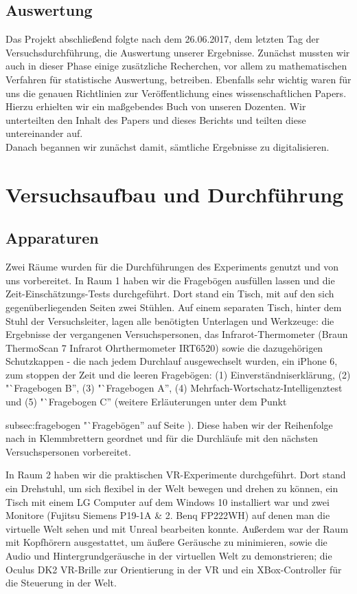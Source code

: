 \documentclass{Bericht}
\begin{document}
	\subsection{Auswertung} %
		Das Projekt abschließend folgte nach dem 26.06.2017, dem letzten Tag der Versuchsdurchführung, die Auswertung unserer Ergebnisse.
		Zunächst mussten wir auch in dieser Phase einige zusätzliche Recherchen, vor allem zu mathematischen Verfahren für statistische Auswertung, betreiben. Ebenfalls sehr wichtig waren für uns die genauen Richtlinien zur Veröffentlichung eines wissenschaftlichen Papers. Hierzu erhielten wir ein maßgebendes Buch von unseren Dozenten. Wir unterteilten den Inhalt des Papers und dieses Berichts und teilten diese untereinander auf.\\
		Danach begannen wir zunächst damit, sämtliche Ergebnisse zu digitalisieren.

\clearpage
	\section{Versuchsaufbau und Durchführung} %


\subsection {Apparaturen}
Zwei Räume wurden für die Durchführungen des Experiments genutzt und von uns vorbereitet. In Raum 1 haben wir die Fragebögen ausfüllen lassen und die Zeit-Einschätzungs-Tests durchgeführt. Dort stand ein Tisch, mit auf den sich gegenüberliegenden Seiten zwei Stühlen. Auf einem separaten Tisch, hinter dem Stuhl der Versuchsleiter, lagen alle benötigten Unterlagen und Werkzeuge: die Ergebnisse der vergangenen Versuchspersonen, das Infrarot-Thermometer (Braun ThermoScan 7 Infrarot Ohrthermometer IRT6520) sowie die dazugehörigen Schutzkappen - die nach jedem Durchlauf ausgewechselt wurden, ein iPhone 6, zum stoppen der Zeit und die leeren Fragebögen: (1) Einverständniserklärung, (2)  "`Fragebogen B'', (3) "`Fragebogen A'', (4) Mehrfach-Wortschatz-Intelligenztest und (5) "`Fragebogen C'' (weitere Erläuterungen unter dem Punkt 

{subsec:fragebogen} "`Fragebögen'' auf Seite \pageref{subsec:fragebogen}). Diese haben wir der Reihenfolge nach in Klemmbrettern geordnet und für die Durchläufe mit den nächsten Versuchspersonen vorbereitet. 

In Raum 2 haben wir die praktischen VR-Experimente durchgeführt. Dort stand ein Drehstuhl, um sich flexibel in der Welt bewegen und drehen zu können, ein Tisch mit einem LG Computer auf dem  Windows 10 installiert war und zwei Monitore (Fujitsu Siemens P19-1A \& 2. Benq FP222WH) auf denen man die virtuelle Welt sehen und mit Unreal bearbeiten konnte. Außerdem war der Raum mit Kopfhörern ausgestattet, um äußere Geräusche zu minimieren, sowie die Audio und Hintergrundgeräusche in der virtuellen Welt zu demonstrieren; die Oculus DK2 VR-Brille zur Orientierung in der VR und ein XBox-Controller für die Steuerung in der Welt.
\end{document}
